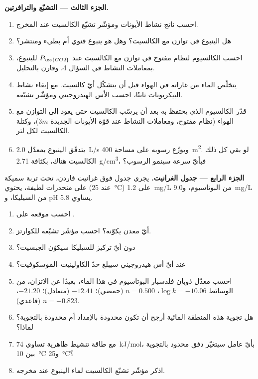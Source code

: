 \begin{problem}
\medskip\noindent\textbf{الجزء الثالث --- التشبّع والترافرتين.}
\begin{enumerate}[resume]
\item احسب ناتج نشاط الأيونات ومؤشّر تشبّع الكالسيت
  عند المخرج.
\item هل الينبوع في توازن مع الكالسيت؟ وهل هو ينبوع قنوي أم
  بطيء ومنتشر؟
\item احسب الكالسيوم لنظام مفتوح في توازن مع الكالسيت عند
  $P_{\ce{CO2}}$ للينبوع، بمعاملات النشاط في السؤال 4،
  وقارن بالتحليل.
\item يتخلّص الماء من غازاته في الهواء قبل أن يتشكّل أيّ كالسيت. مع إبقاء
  نشاط البيكربونات ثابتًا، احسب الأس الهيدروجيني ومؤشّر تشبّعه.
\item قدّر الكالسيوم الذي يحتفظ به بعد أن يرسّب الكالسيت حتى يعود إلى
  التوازن مع الهواء (نظام مفتوح، ومعاملات النشاط عند قوّة الأيونات
  الجديدة $3m$)، وكتلة الكالسيت لكل لتر.
\item يتدفّق الينبوع بمعدّل \qty{2.0}{L/s} ويوزّع رسوبه على مساحة
  \qty{400}{m^2}. لو بقي كل ذلك الكالسيت هناك، بكثافة
  \qty{2.71}{g/cm^3}، فبأيّ سرعة سينمو الرسوب؟
\end{enumerate}

\medskip\noindent\textbf{الجزء الرابع --- جدول الغرانيت.} يجري جدول فوق
غرانيت فاردن، تحت تربة سميكة على منحدرات لطيفة، يحتوي (عند
\qty{25}{\celsius}) على \qty{1.2}{mg/L} من البوتاسيوم، و\qty{9.0}{mg/L} من
السيليكا، و pH يساوي 5.8.
\begin{enumerate}[resume]
\item احسب موقعه على .
\item أيّ معدن يكوّنه؟ احسب مؤشّر تشبّعه للكوارتز.
\item دون أيّ تركيز للسيليكا سيكوّن الجبسيت؟
\item عند أيّ أس هيدروجيني سيبلغ حدّ الكاولينيت--الموسكوفيت؟
\item احسب معدّل ذوبان فلدسبار البوتاسيوم في هذا الماء، بعيدًا عن
  الاتزان، من الوسائط $\log k = -10.06$، $n = 0.500$ (حمضي)؛
  $-12.41$ (متعادل)؛ $-21.20$، $n = -0.823$ (قاعدي).
\item هل تجوية هذه المنطقة المائية أرجح أن تكون محدودة بالإمداد أم
  محدودة بالتجوية؟ لماذا؟
\item مع طاقة تنشيط ظاهرية تساوي \qty{74}{kJ/mol}، بأيّ عامل سيتغيّر
  دفق محدود بالتجوية بين \qty{10}{\celsius}
  و\qty{25}{\celsius}؟
\item اذكر مؤشّر تشبّع الكالسيت لماء الينبوع عند
  مخرجه.
\end{enumerate}
\end{problem}
